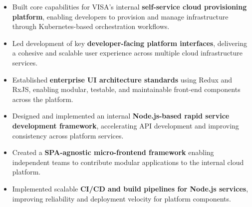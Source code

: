 \begin{itemize}
    \item Built core capabilities for VISA's internal \textbf{self-service cloud provisioning platform}, enabling developers to provision and manage infrastructure through Kubernetes-based orchestration workflows.
    \item Led development of key \textbf{developer-facing platform interfaces}, delivering a cohesive and scalable user experience across multiple cloud infrastructure services.
    \item Established \textbf{enterprise UI architecture standards} using Redux and RxJS, enabling modular, testable, and maintainable front-end components across the platform.
    \item Designed and implemented an internal \textbf{Node.js-based rapid service development framework}, accelerating API development and improving consistency across platform services.
    \item Created a \textbf{SPA-agnostic micro-frontend framework} enabling independent teams to contribute modular applications to the internal cloud platform.
    \item Implemented scalable \textbf{CI/CD and build pipelines for Node.js services}, improving reliability and deployment velocity for platform components.
\end{itemize}